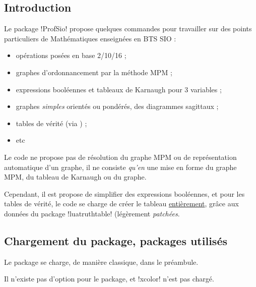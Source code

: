 \documentclass[french,a4paper,11pt]{article}
\begin{document}
{{\subsection{Introduction}

\begin{noteblock}
Le package \packagetex!ProfSio! propose quelques commandes pour travailler sur des points particuliers de Mathématiques enseignées en BTS SIO :

\begin{itemize}
	\item opérations posées en base 2/10/16 ;
	\item graphes d'ordonnancement par la méthode MPM ;
	\item expressions booléennes et tableaux de Karnaugh pour 3 variables ;
	\item graphes \textit{simples} orientés ou pondérés, des diagrammes sagittaux ;
	\item tables de vérité (via ) ;
	\item etc
\end{itemize}
\vspace*{-\baselineskip}\leavevmode
\end{noteblock}

\begin{warningblock}
Le code ne propose pas de \og résolution \fg{} du graphe MPM ou de représentation \og automatique \fg{} d'un graphe, il ne consiste \textit{qu'en} une mise en forme du graphe MPM, du tableau de Karnaugh ou du graphe.

\smallskip

Cependant, il est propose de \og simplifier \fg{} des expressions booléennes, et pour les tables de vérité, le code se charge de créer le tableau \underline{entièrement}, grâce aux données du package \packagetex!luatruthtable! (légèrement \textit{patchées}.
\end{warningblock}

\subsection{Chargement du package, packages utilisés}

\begin{importantblock}
Le package se charge, de manière classique, dans le préambule.

Il n'existe pas d'option pour le package, et \packagetex!xcolor! n'est pas chargé.
\end{importantblock}

}}
\end{document}

